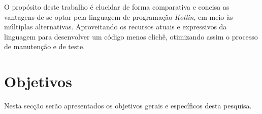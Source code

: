 O propósito deste trabalho é elucidar de forma comparativa e concisa as vantagens de se optar pela linguagem de programação \textit{Kotlin}, em meio às múltiplas alternativas. Aproveitando os recursos atuais e expressivos da linguagem para desenvolver um código menos clichê, otimizando assim o processo de manutenção e de teste. 


 



\section{Objetivos}
Nesta secção serão apresentados os objetivos gerais e específicos desta pesquisa.

